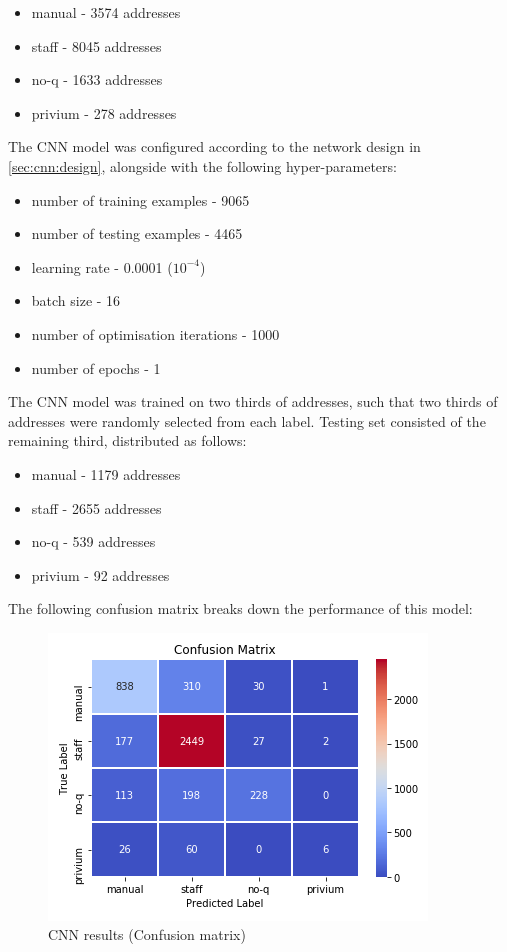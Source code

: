 \begin{itemize}
	\item manual - 3574 addresses
	\item staff - 8045 addresses
	\item no-q - 1633 addresses
	\item privium - 278 addresses
\end{itemize}

\par
The CNN model was configured according to the network design in \cref{sec:cnn:design}, alongside with the following hyper-parameters: 
\begin{itemize}
	\item number of training examples - 9065
	\item number of testing examples - 4465
	\item learning rate - 0.0001 ($10^{-4}$)
	\item batch size - 16
	\item number of optimisation iterations - 1000
	\item number of epochs - 1
\end{itemize}

\par
The CNN model was trained on two thirds of addresses, such that two thirds of addresses were randomly selected from each label. Testing set consisted of the remaining third, distributed as follows:

\begin{itemize}
	\item manual - 1179 addresses
	\item staff - 2655 addresses
	\item no-q - 539 addresses
	\item privium - 92 addresses
\end{itemize}

\par
The following confusion matrix breaks down the performance of this model:

\begin{figure}[H]
    \centering
    \includegraphics[width=.5\textwidth]{Pictures/Cnn_cm2.png}
    \caption{CNN results (Confusion matrix)}
    \label{fig:cnn:cm}
\end{figure}

